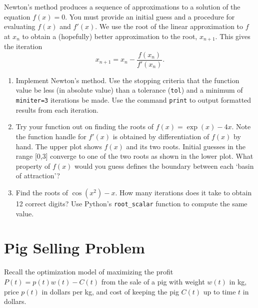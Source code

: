 \documentclass[letter]{article}
\begin{document}
Newton's method produces a sequence of approximations to a solution of the equation $f(x)=0$. You must provide an initial guess and a procedure for evaluating $f(x)$ and $f'(x)$. We use the root of the linear approximation to $f$ at $x_n$ to obtain a (hopefully) better approximation to the root, $x_{n+1}$. This gives the iteration 
$$x_{n+1} = x_n - \frac{f(x_n)}{f'(x_n)}.$$

\begin{enumerate}[resume]

\item Implement Newton's method. Use the stopping criteria that the function value be less (in absolute value) than a tolerance (\verb|tol|) and a minimum of \verb|miniter=3| iterations be made. Use the command \verb|print| to output formatted results from each iteration.

\item Try your function out on finding the roots of $f(x) = \exp(x) - 4x$. Note the function handle for $f'(x)$ is obtained by differentiation of $f(x)$ by hand. The upper plot shows $f(x)$ and its two roots. Initial guesses in the range [0,3] converge to one of the two roots as shown in the lower plot. What property of $f(x)$ would you guess defines the boundary between each `basin of attraction'?

\item Find the roots of $\cos(x^2) - x$. How many iterations does it take to obtain 12 correct digits? Use Python's \verb|root_scalar| function to compute the same value.

\end{enumerate}

\section{Pig Selling Problem}

Recall the optimization model of maximizing the profit $P(t) = p(t)w(t) - C(t)$ from the sale of a pig with weight $w(t)$ in kg, price $p(t)$ in dollars per kg, and cost of keeping the pig $C(t)$ up to time $t$ in dollars.
\end{document}
